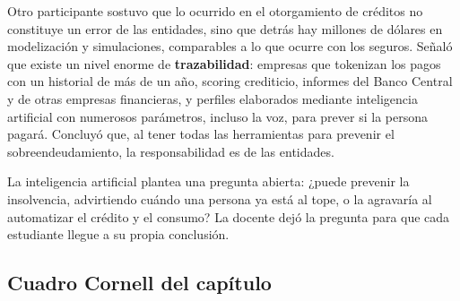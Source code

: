 \documentclass[12pt,oneside]{book}
\begin{document}
Otro participante sostuvo que lo ocurrido en el otorgamiento de créditos no constituye un error de las entidades, sino que detrás hay millones de dólares en modelización y simulaciones, comparables a lo que ocurre con los seguros. Señaló que existe un nivel enorme de \textbf{trazabilidad}: empresas que tokenizan los pagos con un historial de más de un año, scoring crediticio, informes del Banco Central y de otras empresas financieras, y perfiles elaborados mediante inteligencia artificial con numerosos parámetros, incluso la voz, para prever si la persona pagará. Concluyó que, al tener todas las herramientas para prevenir el sobreendeudamiento, la responsabilidad es de las entidades.

\begin{important}
La inteligencia artificial plantea una pregunta abierta: ¿puede prevenir la insolvencia, advirtiendo cuándo una persona ya está al tope, o la agravaría al automatizar el crédito y el consumo? La docente dejó la pregunta para que cada estudiante llegue a su propia conclusión.
\end{important}

\subsection*{Cuadro Cornell del capítulo}
\end{document}
